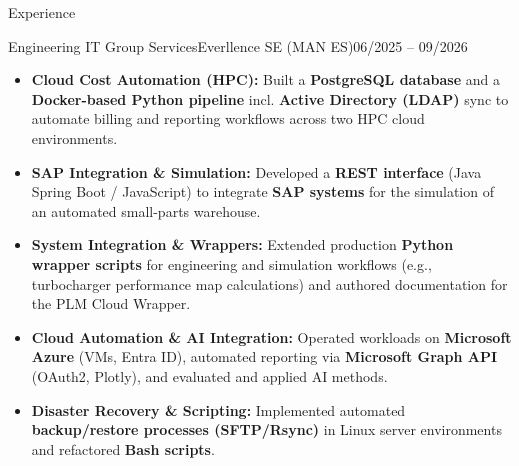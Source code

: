 \documentclass[]{mcdowellcv}
\begin{document}
    
    \makeheader
    
    
    \begin{cvsection}{Experience}

        \begin{cvsubsection}{Engineering IT Group Services}{Everllence SE (MAN ES)}{06/2025 -- 09/2026} 
            \begin{itemize}
                \item \textbf{Cloud Cost Automation (HPC):} Built a \textbf{PostgreSQL database} and a \textbf{Docker-based Python pipeline} incl. \textbf{Active Directory (LDAP)} sync to automate billing and reporting workflows across two HPC cloud environments.
                \item \textbf{SAP Integration \& Simulation:} Developed a \textbf{REST interface} (Java Spring Boot / JavaScript) to integrate \textbf{SAP systems} for the simulation of an automated small-parts warehouse.
                \item \textbf{System Integration \& Wrappers:} Extended production \textbf{Python wrapper scripts} for engineering and simulation workflows (e.g., turbocharger performance map calculations) and authored documentation for the PLM Cloud Wrapper.
                \item \textbf{Cloud Automation \& AI Integration:} Operated workloads on \textbf{Microsoft Azure} (VMs, Entra ID), automated reporting via \textbf{Microsoft Graph API} (OAuth2, Plotly), and evaluated and applied AI methods.
                \item \textbf{Disaster Recovery \& Scripting:} Implemented automated \textbf{backup/restore processes (SFTP/Rsync)} in Linux server environments and refactored \textbf{Bash scripts}.
            \end{itemize}
        \end{cvsubsection}
        
        \vspace{0.15cm}
        

\end{cvsection}
\end{document}
